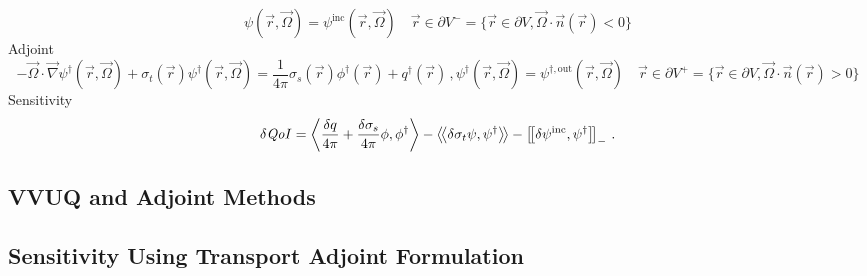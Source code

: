 \documentclass[review]{elsarticle}
\newcommand{\vr}{\vec{r}}
\newcommand{\vO}{\vec{\Omega}}
\newcommand{\bra}{\left\langle}
\newcommand{\ket}{\right\rangle}
\newcommand{\braSN}{\left\langle \! \left\langle}
\newcommand{\ketSN}{\right\rangle \! \right\rangle}
\newcommand{\sbraSN}{\left[ \! \left[}
\newcommand{\sketSN}{\right] \! \right]}
\newcommand{\grad}{\vec{\nabla}}
\newcommand{\sigt}{\sigma_t}
\newcommand{\sigs}{\sigma_s}
\newcommand{\angSourced}{\frac{\delta q}{4 \pi}}
\newcommand{\qoi}{{\it QoI}\xspace}
\begin{document}
{\begin{subequations}
\begin{equation}
\label{SS1GTE_bc}
\psi(\vr,\vO) = \psi^{\text{inc}}(\vr,\vO) \quad \vr \in \partial V^{-} = \{ \vr \in \partial V,  \vO \cdot \vec{n}(\vr) < 0\}
\end{equation}
\end{subequations}
Adjoint
\begin{subequations}\label{eqs:TransportAdjSystem}
\begin{equation}
\label{SS1GTE}
- \vO \cdot \grad \psi^\dag(\vr,\vO) + \sigt(\vr) \psi^\dag(\vr,\vO) = \frac{1}{4 \pi} \sigs(\vr) \phi^\dag(\vr) + q^\dag(\vr)\, ,
\end{equation}
\begin{equation}
\label{SS1GTE_bc}
\psi^\dag(\vr,\vO) = \psi^{\dag,\text{out}}(\vr,\vO) \quad \vr \in \partial V^{+} = \{ \vr \in \partial V,  \vO \cdot \vec{n}(\vr) > 0\}
\end{equation}
\end{subequations}
Sensitivity
\begin{equation}
\delta \qoi = \bra \angSourced  + \frac{\delta\sigs}{4 \pi} \phi , \phi^\dag  \ket - \braSN  \delta \sigt \psi , \psi^\dag \ketSN - \sbraSN \delta \psi^{\text{inc}}, \psi^\dag \sketSN_- \,.
\end{equation}
}

\subsection{VVUQ and Adjoint Methods}

\subsection{Sensitivity Using Transport Adjoint Formulation}

\end{document}
